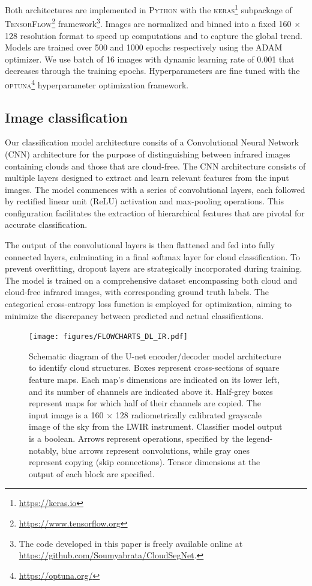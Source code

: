 \documentclass{article}
\begin{document}
Both architectures are implemented in \textsc{Python} with the \textsc{keras}\footnote{\url{https://keras.io}} subpackage of \textsc{TensorFlow}\footnote{\url{https://www.tensorflow.org}} framework\footnote{The code developed in this paper is freely available online at \url{https://github.com/Soumyabrata/CloudSegNet}.}. Images are normalized and binned into a fixed 160 $\times$ 128 resolution format to speed up computations and to capture the global trend. Models are trained over 500 and 1000 epochs respectively using the ADAM optimizer. We use batch of 16 images with dynamic learning rate of 0.001 that decreases through the training epochs. Hyperparameters are fine tuned with the \textsc{optuna}\footnote{\url{https://optuna.org/}} hyperparameter optimization framework.

\subsection{Image classification}

Our classification model architecture consits of a Convolutional Neural Network (CNN) architecture for the purpose of distinguishing between infrared images containing clouds and those that are cloud-free. The CNN architecture consists of multiple layers designed to extract and learn relevant features from the input images. The model commences with a series of convolutional layers, each followed by rectified linear unit (ReLU) activation and max-pooling operations. This configuration facilitates the extraction of hierarchical features that are pivotal for accurate classification.

The output of the convolutional layers is then flattened and fed into fully connected layers, culminating in a final softmax layer for cloud classification. To prevent overfitting, dropout layers are strategically incorporated during training. The model is trained on a comprehensive dataset encompassing both cloud and cloud-free infrared images, with corresponding ground truth labels. The categorical cross-entropy loss function is employed for optimization, aiming to minimize the discrepancy between predicted and actual classifications.

\begin{figure}[!h]
	\texttt{[image: figures/FLOWCHARTS\_DL\_IR.pdf]}
	\caption{
		Schematic diagram of the U-net encoder/decoder model architecture to identify cloud structures. Boxes represent cross-sections of square feature maps. Each map's dimensions are indicated on its lower left, and its number of channels are indicated above it. Half-grey boxes represent maps for which half of their channels are copied. The input image is a 160 × 128 radiometrically calibrated grayscale image of the sky from the LWIR instrument. Classifier model output is a boolean. Arrows represent operations, specified by the legend-notably, blue arrows represent convolutions, while gray ones represent copying (skip connections). Tensor dimensions at the output of each block are specified.  \label{fig1}}
	\end{figure}
	\unskip
\end{document}
